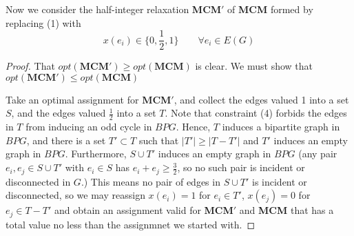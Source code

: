 Now we consider the half-integer relaxation \textbf{MCM$'$} of \textbf{MCM} formed by replacing (1) with
\begin{equation*}\tag{$1'$}x(e_i) \in \{0, \frac{1}{2}, 1\} \qquad \forall e_i \in E(G)\end{equation*}
\begin{proof}
	That $opt(\textbf{MCM$'$}) \geq opt(\textbf{MCM})$ is clear.  We must show that $opt(\textbf{MCM$'$}) \leq opt(\textbf{MCM})$

	Take an optimal assignment for \textbf{MCM$'$}, and collect the edges valued 1 into a set $S$, and the edges valued $\frac{1}{2}$ into a set $T$.  Note that constraint (4) forbids the edges in $T$ from inducing an odd cycle in $BPG$.  Hence, $T$ induces a bipartite graph in $BPG$, and there is a set $T'\subset T$ such that $|T'| \geq |T-T'|$ and $T'$ induces an empty graph in $BPG$.  Furthermore, $S \cup T'$ induces an empty graph in $BPG$ (any pair $e_i, e_j \in S\cup T'$ with $e_i \in S$ has $e_i + e_j \geq \frac{3}{2}$, so no such pair is incident or disconnected in $G$.)  This means no pair of edges in $S\cup T'$ is incident or disconnected, so we may reassign $x(e_i) = 1$ for $e_i \in T'$, $x(e_j) = 0$ for $e_j \in T-T'$ and obtain an assignment valid for \textbf{MCM$'$} and \textbf{MCM} that has a total value no less than the assignmnet we started with.
\end{proof}

